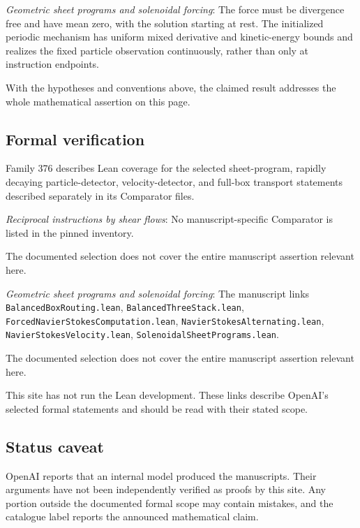 \documentclass[11pt]{article}
\begin{document}
\textit{Geometric sheet programs and solenoidal forcing}: The force must be divergence free and have mean zero, with the solution starting at rest. The initialized periodic mechanism has uniform mixed derivative and kinetic-energy bounds and realizes the fixed particle observation continuously, rather than only at instruction endpoints.

With the hypotheses and conventions above, the claimed result addresses the whole mathematical assertion on this page.

\subsection{Formal verification}
Family 376 describes Lean coverage for the selected sheet-program, rapidly decaying particle-detector, velocity-detector, and full-box transport statements described separately in its Comparator files.

\textit{Reciprocal instructions by shear flows}: No manuscript-specific Comparator is listed in the pinned inventory.

The documented selection does not cover the entire manuscript assertion relevant here.

\textit{Geometric sheet programs and solenoidal forcing}: The manuscript links \texttt{BalancedBoxRouting.lean}, \texttt{BalancedThreeStack.lean}, \texttt{ForcedNavierStokesComputation.lean}, \texttt{NavierStokesAlternating.lean}, \texttt{NavierStokesVelocity.lean}, \texttt{SolenoidalSheetPrograms.lean}.

The documented selection does not cover the entire manuscript assertion relevant here.

This site has not run the Lean development. These links describe OpenAI’s selected formal statements and should be read with their stated scope.

\subsection{Status caveat}
OpenAI reports that an internal model produced the manuscripts. Their arguments have not been independently verified as proofs by this site. Any portion outside the documented formal scope may contain mistakes, and the catalogue label reports the announced mathematical claim.
\end{document}

